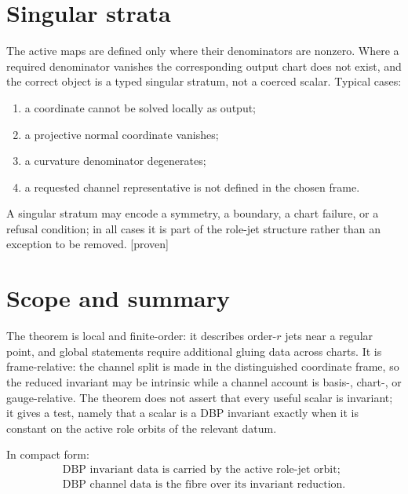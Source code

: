 \documentclass[11pt]{article}
\newcommand{\Proven}{\textsf{[proven]}}
\theoremstyle{plain}
\theoremstyle{definition}
\begin{document}
\section{Singular strata}
\label{sec:singular}

The active maps are defined only where their denominators are nonzero. Where a required denominator
vanishes the corresponding output chart does not exist, and the correct object is a typed singular
stratum, not a coerced scalar. Typical cases:
\begin{enumerate}[itemsep=1pt,topsep=2pt]
\item a coordinate cannot be solved locally as output;
\item a projective normal coordinate vanishes;
\item a curvature denominator degenerates;
\item a requested channel representative is not defined in the chosen frame.
\end{enumerate}
A singular stratum may encode a symmetry, a boundary, a chart failure, or a refusal condition; in all
cases it is part of the role-jet structure rather than an exception to be removed. \Proven

\section{Scope and summary}
\label{sec:scope}

The theorem is local and finite-order: it describes order-$r$ jets near a regular point, and global
statements require additional gluing data across charts. It is frame-relative: the channel split is
made in the distinguished coordinate frame, so the reduced invariant may be intrinsic while a channel
account is basis-, chart-, or gauge-relative. The theorem does not assert that every useful scalar is
invariant; it gives a test, namely that a scalar is a DBP invariant exactly when it is constant on the
active role orbits of the relevant datum.

\medskip
\noindent In compact form:
\[
\boxed{\;
\begin{gathered}
\text{DBP invariant data is carried by the active role-jet orbit;}\\
\text{DBP channel data is the fibre over its invariant reduction.}
\end{gathered}\;}
\]
\end{document}
